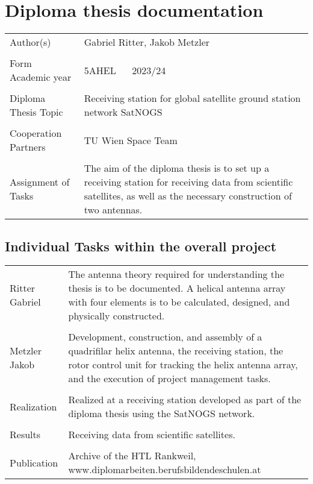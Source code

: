 \section *{Diploma thesis documentation}

\begin{tabular}{@{}p{5cm}p{8cm}}
	Author(s) & Gabriel Ritter, Jakob Metzler\\ & \\
	
	Form ~\textbar~ Academic year & 5AHEL ~\textbar~ 2023/24 \\ & \\
	
	Diploma Thesis Topic & Receiving station for global satellite ground station network SatNOGS \\ & \\
	
	Cooperation Partners & TU Wien Space Team\cite{noauthor_sts1_nodate} \\ & \\
	
	Assignment of Tasks & The aim of the diploma thesis is to set up a receiving station for receiving data from scientific satellites, as well as the necessary construction of two antennas. \\
\end{tabular}

\pagebreak

\subsection *{Individual Tasks within the overall project}
\begin{tabular}{@{}p{5cm}p{8cm}}
	
	Ritter Gabriel & The antenna theory required for understanding the thesis is to be documented. A helical antenna array with four elements is to be calculated, designed, and physically constructed. \\ & \\
	
	Metzler Jakob & Development, construction, and assembly of a quadrifilar helix antenna, the receiving station, the rotor control unit for tracking the helix antenna array, and the execution of project management tasks. \\ & \\
	
	Realization & Realized at a receiving station developed as part of the diploma thesis using the SatNOGS network\cite{noauthor_satnogshomepage_nodate}. \\ & \\
	
	Results & Receiving data from scientific satellites. \\ & \\
	
	Publication & Archive of the HTL Rankweil, \newline  www.diplomarbeiten.berufsbildendeschulen.at \\
\end{tabular}
